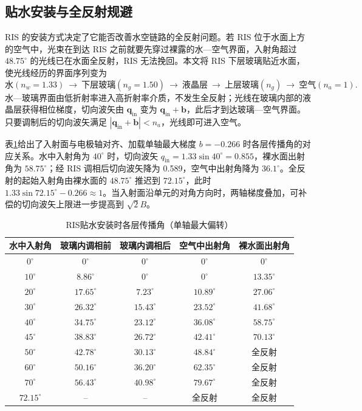 \subsection{贴水安装与全反射规避}

RIS 的安装方式决定了它能否改善水空链路的全反射问题。若 RIS 位于水面上方的空气中，光束在到达 RIS 之前就要先穿过裸露的水—空气界面，入射角超过 $48.75^\circ$ 的光线已在水面全反射，RIS 无法挽回。本文将 RIS 下层玻璃贴近水面，使光线经历的界面序列变为
\begin{equation*}
\text{水}(n_w=1.33)\ \rightarrow\ \text{下层玻璃}(n_g=1.50)\ \rightarrow\ \text{液晶层}\ \rightarrow\ \text{上层玻璃}(n_g)\ \rightarrow\ \text{空气}(n_a=1).
\end{equation*}
水—玻璃界面由低折射率进入高折射率介质，不发生全反射；光线在玻璃内部的液晶层获得相位梯度，切向波矢由 $\mathbf q_{\mathrm{in}}$ 变为 $\mathbf q_{\mathrm{in}}+\mathbf b$，此后才到达玻璃—空气界面。只要调制后的切向波矢满足 $|\mathbf q_{\mathrm{in}}+\mathbf b|<n_a$，光线即可进入空气。

表\ref{tab:c3_angles}给出了入射面与电极轴对齐、加载单轴最大梯度 $b=-0.266$ 时各层传播角的对应关系。水中入射角为 $40^\circ$ 时，切向波矢 $q_{\mathrm{in}}=1.33\sin40^\circ=0.855$，裸水面出射角为 $58.75^\circ$；经 RIS 调相后切向波矢降为 0.589，空气中出射角降为 $36.1^\circ$。全反射的起始入射角由裸水面的 $48.75^\circ$ 推迟到 $72.15^\circ$，此时 $1.33\sin72.15^\circ-0.266\approx1$。当入射面沿单元的对角方向时，两轴梯度叠加，可补偿的切向波矢上限进一步提高到 $\sqrt2B$。

\begin{table}[htbp]
\caption{RIS贴水安装时各层传播角（单轴最大偏转）}
\label{tab:c3_angles}
\centering
\begin{tabular}{ccccc}
\toprule
水中入射角 & 玻璃内调相前 & 玻璃内调相后 & 空气中出射角 & 裸水面出射角 \\
\midrule
$0^\circ$  & $0^\circ$     & $0^\circ$     & $0^\circ$     & $0^\circ$ \\
$10^\circ$ & $8.86^\circ$  & $0^\circ$     & $0^\circ$     & $13.35^\circ$ \\
$20^\circ$ & $17.65^\circ$ & $7.23^\circ$  & $10.89^\circ$ & $27.06^\circ$ \\
$30^\circ$ & $26.32^\circ$ & $15.43^\circ$ & $23.52^\circ$ & $41.68^\circ$ \\
$40^\circ$ & $34.75^\circ$ & $23.12^\circ$ & $36.08^\circ$ & $58.75^\circ$ \\
$45^\circ$ & $38.83^\circ$ & $26.72^\circ$ & $42.41^\circ$ & $70.13^\circ$ \\
$50^\circ$ & $42.78^\circ$ & $30.13^\circ$ & $48.84^\circ$ & 全反射 \\
$60^\circ$ & $50.16^\circ$ & $36.20^\circ$ & $62.35^\circ$ & 全反射 \\
$70^\circ$ & $56.43^\circ$ & $40.98^\circ$ & $79.67^\circ$ & 全反射 \\
$72.15^\circ$ & -- & -- & 全反射 & 全反射 \\
\bottomrule
\end{tabular}
\end{table}

